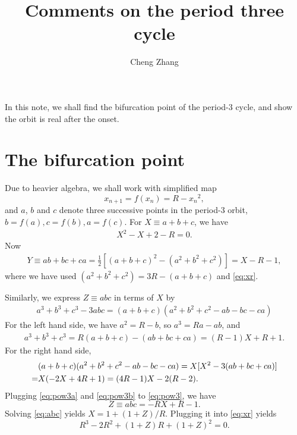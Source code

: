 \documentclass[12pt]{article}
\begin{document}
\title{Comments on the period three cycle}
\author{Cheng Zhang}
\maketitle

In this note, we shall
  find the bifurcation point of the period-3 cycle,
  and show the orbit is real after the onset.

\section{The bifurcation point}
Due to heavier algebra, we shall work with simplified map
\[
x_{n+1} = f(x_n) = R - {x_n}^2,
\]
and $a$, $b$ and $c$ denote three successive points in the period-3 orbit,
$b=f(a), c=f(b), a=f(c)$.
For $X \equiv a + b + c$, we have
\begin{align}
X^2 - X + 2 - R = 0.
\label{eq:xr}
\end{align}
%
Now
\begin{align}
 Y \equiv a b + b c + c a
= \frac{1}{2} [ (a + b + c)^2 - (a^2 + b^2 + c^2) ]
= X - R - 1,
\label{eq:y}
\end{align}
where we have used $(a^2 + b^2 + c^2) = 3R - (a+b+c)$ and \eqref{eq:xr}.

Similarly, we express $Z \equiv abc$ in terms of $X$ by
\begin{align}
  a^3 + b^3 + c^3 - 3 a b c =
 (a + b + c) (a^2 + b^2 + c^2 - a b - b c - c a)
\label{eq:pow3}
\end{align}
For the left hand side, we have $a^2 = R - b$, so $a^3 = R a - ab$, and
\begin{align}
  a^3 +b^3 + c^3
= R (a+b+c) - (ab+bc+ca)
= (R - 1) X + R + 1.
\label{eq:pow3a}
\end{align}
%
For the right hand side,
\begin{align}
& (a + b + c) (a^2 + b^2 + c^2 - a b - b c - c a)
= X [X^2 - 3(ab + bc + ca)] \notag\\
=& X (-2X + 4R + 1)
= (4R-1) X -2(R-2).
\label{eq:pow3b}
\end{align}
Plugging \eqref{eq:pow3a} and \eqref{eq:pow3b} to \eqref{eq:pow3}, we have
\begin{equation}
Z \equiv abc = -RX + R - 1.
\label{eq:abc}
\end{equation}
Solving \eqref{eq:abc} yields $X = 1 + (1+Z)/R$.
Plugging it into \eqref{eq:xr} yields
\begin{equation}
  R^3 - 2R^2 + (1+Z)R + (1+Z)^2 = 0.
\end{equation}
\end{document}
